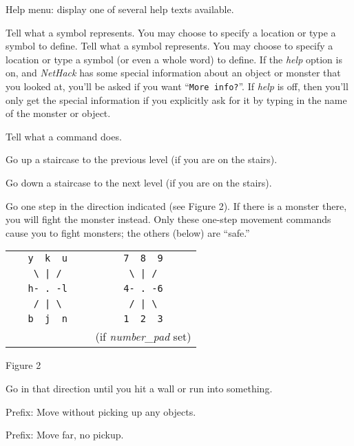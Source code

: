 \blist{}
\item[\tb{?}]
Help menu:  display one of several help texts available.
\item[\tb{/}]
Tell what a symbol represents.  You may choose to specify a location
or type a symbol to define.
Tell what a symbol represents.  You may choose to specify a location
or type a symbol (or even a whole word) to define.  If the
{\it help\/}
option is on, and {\it NetHack\/} has some special information about an object or
monster that you looked at, you'll be asked if you want ``{\tt More
info?}''.
If {\it help\/} is off, then you'll only get the special information if you
explicitly ask for it by typing in the name of the monster or object.
\item[\tb{\&}]
Tell what a command does.
\item[\tb{<}]
Go up a staircase to the previous level (if you are on the stairs).
\item[\tb{>}]
Go down a staircase to the next level (if you are on the stairs).
\item[\tb{[yuhjklbn]}]
Go one step in the direction indicated (see Figure 2).  If there is
a monster there, you will fight the monster instead.  Only these
one-step movement commands cause you to fight monsters; the others
(below) are ``safe.''
\begin{center}
\begin{tabular}{cc}
\verb+   y  k  u   + & \verb+   7  8  9   +\\
\verb+    \ | /    + & \verb+    \ | /    +\\
\verb+   h- . -l   + & \verb+   4- . -6   +\\
\verb+    / | \    + & \verb+    / | \    +\\
\verb+   b  j  n   + & \verb+   1  2  3   +\\
                     & (if {\it number\_pad\/} set)
\end{tabular}
\end{center}
\begin{center}
Figure 2
\end{center}
\item[\tb{[YUHJKLBN]}]
Go in that direction until you hit a wall or run into something.
\item[\tb{m[yuhjklbn]}]
Prefix:  Move without picking up any objects.
\item[\tb{M[yuhjklbn]}]
Prefix:  Move far, no pickup.
\item[\tb{g[yuhjklbn]}]
